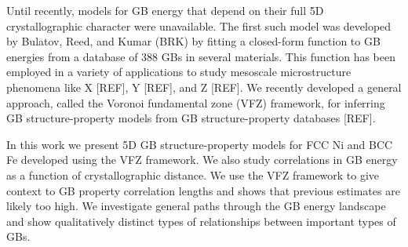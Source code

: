 \documentclass[final,twocolumn,12pt]{elsarticle}
\begin{document}
	Until recently, models for GB energy that depend on their full 5D crystallographic character were unavailable. The first such model was developed by Bulatov, Reed, and Kumar (BRK) \cite{bulatovGrainBoundaryEnergy2014} by fitting a closed-form function to GB energies from a database \cite{olmstedSurveyComputedGrain2009a} of 388 GBs in several materials. This function has been employed in a variety of applications to study mesoscale microstructure phenomena like X [REF], Y [REF], and Z [REF]. We recently developed a general approach, called the Voronoi fundamental zone (VFZ) framework, for inferring GB structure-property models from GB structure-property databases [REF]. 
	
	In this work we present 5D GB structure-property models for FCC Ni and BCC Fe developed using the VFZ framework. We also study correlations in GB energy as a function of crystallographic distance. We use the VFZ framework to give context to GB property correlation lengths and shows that previous estimates are likely too high. We investigate general paths through the GB energy landscape and show qualitatively distinct types of relationships between important types of GBs.
	
	
	
	

	
\end{document}
